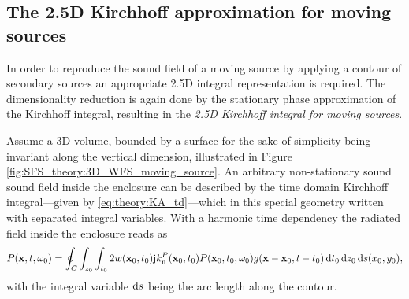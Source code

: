 \subsection{The 2.5D Kirchhoff approximation for moving sources}

In order to reproduce the sound field of a moving source by applying a contour of secondary sources an appropriate 2.5D integral representation is required.
The dimensionality reduction is again done by the stationary phase approximation of the Kirchhoff integral, resulting in the \emph{2.5D Kirchhoff integral for moving sources}.

Assume a 3D volume, bounded by a surface for the sake of simplicity being invariant along the vertical dimension, illustrated in Figure \ref{fig:SFS_theory:3D_WFS_moving_source}.
An arbitrary non-stationary sound sound field inside the enclosure can be described by the time domain Kirchhoff integral---given by \eqref{eq:theory:KA_td}---which in this special geometry written with separated integral variables.
With a harmonic time dependency the radiated field inside the enclosure reads as
\begin{equation}
\small
P(\mathbf{x},t,\omega_0) = 
\oint_{C} \int_{z_0} \int_{t_0}
2 w(\mathbf{x}_0,t_0) \mathrm{j} k_{\mathrm{n}}^P(\mathbf{x}_0,t_0) 	
P(\mathbf{x}_0,t_0,\omega_0) g(\mathbf{x}-\mathbf{x}_0,t-t_0) \, \mathrm{d} t_0 \, \mathrm{d} z_0 \, \mathrm{d} s(x_0, y_0),
\label{Eq:SFS_theory:Kirchhoff_spec_geom_td}
\end{equation}
with the integral variable $\mathrm{d} s$ being the arc length along the contour.
%

